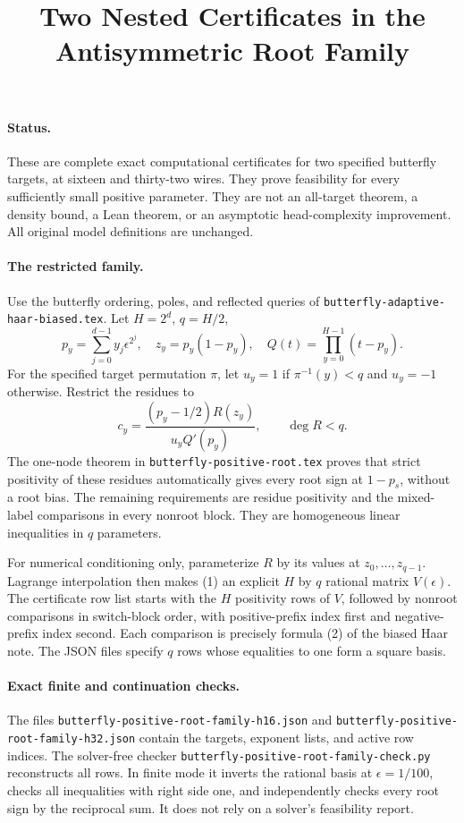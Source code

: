 \documentclass[11pt]{article}
\title{Two Nested Certificates in the Antisymmetric Root Family}
\author{}\date{}
\begin{document}
\maketitle
\paragraph{Status.}
These are complete exact computational certificates for two specified
butterfly targets, at sixteen and thirty-two wires. They prove feasibility
for every sufficiently small positive parameter. They are not an
all-target theorem, a density bound, a Lean theorem, or an asymptotic
head-complexity improvement. All original model definitions are unchanged.

\paragraph{The restricted family.}
Use the butterfly ordering, poles, and reflected queries of
\texttt{butterfly-adaptive-haar-biased.tex}. Let $H=2^d$, $q=H/2$,
\[
 p_y=\sum_{j=0}^{d-1}y_j\epsilon^{2^j},\quad
 z_y=p_y(1-p_y),\quad Q(t)=\prod_{y=0}^{H-1}(t-p_y).
\]
For the specified target permutation $\pi$, let
$u_y=1$ if $\pi^{-1}(y)<q$ and $u_y=-1$ otherwise. Restrict the residues to
\[
 c_y=\frac{(p_y-1/2)R(z_y)}{u_yQ'(p_y)},\qquad \deg R<q.       \tag{1}
\]
The one-node theorem in \texttt{butterfly-positive-root.tex} proves that
strict positivity of these residues automatically gives every root sign
at $1-p_s$, without a root bias. The remaining requirements are residue
positivity and the mixed-label comparisons in every nonroot block.
They are homogeneous linear inequalities in $q$ parameters.

For numerical conditioning only, parameterize $R$ by its values at
$z_0,\ldots,z_{q-1}$. Lagrange interpolation then makes (1) an explicit
$H$ by $q$ rational matrix $V(\epsilon)$. The certificate row list starts
with the $H$ positivity rows of $V$, followed by nonroot comparisons in
switch-block order, with positive-prefix index first and negative-prefix
index second. Each comparison is precisely formula (2) of the biased
Haar note. The JSON files specify $q$ rows whose equalities to one form a
square basis.

\paragraph{Exact finite and continuation checks.}
The files \texttt{butterfly-positive-root-family-h16.json} and
\texttt{butterfly-positive-root-family-h32.json} contain the targets,
exponent lists, and active row indices. The solver-free checker
\texttt{butterfly-positive-root-family-check.py} reconstructs all rows.
In finite mode it inverts the rational basis at $\epsilon=1/100$, checks
all inequalities with right side one, and independently checks every
root sign by the reciprocal sum. It does not rely on a solver's
feasibility report.
\end{document}
